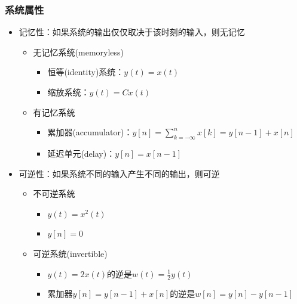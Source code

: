 \documentclass[CJKutf8,xcolor=pdftex,dvipsnames,table]{beamer}
\begin{document}
\begin{CJK*}{UTF8}{song}
  \begin{frame}
    \frametitle{系统属性}
    \begin{itemize}
    \item 记忆性：如果系统的输出仅仅取决于该时刻的输入，则无记忆
        \begin{itemize}
        \item 无记忆系统(memoryless)
            \begin{itemize}
            \item 恒等(identity)系统：$y(t)=x(t)$
            \item 缩放系统：$y(t)=Cx(t)$
            \end{itemize}
        \item 有记忆系统   
            \begin{itemize}
			\item 累加器(accumulator)：$y[n]=\sum_{k=-\infty}^{n}x[k]=y[n-1]+x[n]$
            \item 延迟单元(delay)：$y[n]=x[n-1]$
            \end{itemize}
        \end{itemize}       
    \item 可逆性：如果系统不同的输入产生不同的输出，则可逆
        \begin{itemize}
        \item 不可逆系统
            \begin{itemize}
            \item $y(t)=x^2(t)$
            \item $y[n]=0$
            \end{itemize}
        \item 可逆系统(invertible)    
            \begin{itemize}
            \item $y(t)=2x(t)$的逆是$w(t)=\frac{1}{2}y(t)$
	   \item 累加器$y[n]=y[n-1]+x[n]$的逆是$w[n]=y[n]-y[n-1]$
            \end{itemize}
        \end{itemize} 
    \end{itemize} 
  \end{frame}


\end{CJK*}
\end{document}
